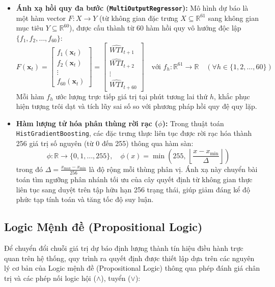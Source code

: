 \begin{itemize}
    \item \textbf{Ánh xạ hồi quy đa bước (\texttt{MultiOutputRegressor}):} 
    Mô hình dự báo là một hàm vector $F: X \to Y$ (từ không gian đặc trưng $X \subseteq \mathbb{R}^{61}$ sang không gian mục tiêu $Y \subseteq \mathbb{R}^{60}$), được cấu thành từ 60 hàm hồi quy vô hướng độc lập $\{f_1, f_2, \dots, f_{60}\}$:
    \begin{equation*}
        F(\mathbf{x}_t) = \begin{bmatrix} f_1(\mathbf{x}_t) \\ f_2(\mathbf{x}_t) \\ \vdots \\ f_{60}(\mathbf{x}_t) \end{bmatrix} = \begin{bmatrix} \widehat{WTI}_{t+1} \\ \widehat{WTI}_{t+2} \\ \vdots \\ \widehat{WTI}_{t+60} \end{bmatrix} \quad \text{với } f_h: \mathbb{R}^{61} \to \mathbb{R} \quad (\forall h \in \{1, 2, \dots, 60\})
    \end{equation*}
    Mỗi hàm $f_h$ ước lượng trực tiếp giá trị tại phút tương lai thứ $h$, khắc phục hiện tượng trôi dạt và tích lũy sai số so với phương pháp hồi quy đệ quy lặp.

    \item \textbf{Hàm lượng tử hóa phân thùng rời rạc ($\phi$):} 
    Trong thuật toán \texttt{HistGradientBoosting}, các đặc trưng thực liên tục được rời rạc hóa thành 256 giá trị số nguyên (từ 0 đến 255) thông qua hàm sàn:
    \begin{equation*}
        \phi: \mathbb{R} \to \{0, 1, \dots, 255\}, \quad \phi(x) = \min\left(255, \, \left\lfloor \frac{x - x_{\min}}{\Delta} \right\rfloor\right)
    \end{equation*}
    trong đó $\Delta = \frac{x_{\max} - x_{\min}}{256}$ là độ rộng mỗi thùng phân vị. Ánh xạ này chuyển bài toán tìm ngưỡng phân nhánh tối ưu của cây quyết định từ không gian thực liên tục sang duyệt trên tập hữu hạn 256 trạng thái, giúp giảm đáng kể độ phức tạp tính toán và tăng tốc độ suy luận.
\end{itemize}

\subsection{Logic Mệnh đề (Propositional Logic)}

Để chuyển đổi chuỗi giá trị dự báo định lượng thành tín hiệu điều hành trực quan trên hệ thống, quy trình ra quyết định được thiết lập dựa trên các nguyên lý cơ bản của Logic mệnh đề (Propositional Logic) thông qua phép đánh giá chân trị và các phép nối logic hội ($\land$), tuyển ($\lor$):

